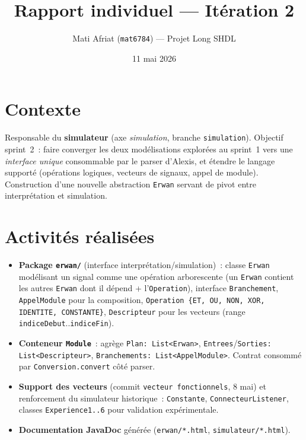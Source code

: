 \documentclass[11pt,a4paper]{article}
\title{\vspace{-1.5cm}Rapport individuel --- It\'eration 2}
\author{Mati Afriat (\texttt{mat6784}) --- Projet Long SHDL}
\date{11 mai 2026}
\begin{document}
\maketitle
\vspace{-2em}

\section*{Contexte}
Responsable du \textbf{simulateur} (axe \emph{simulation}, branche \texttt{simulation}). Objectif sprint~2~: faire converger les deux mod\'elisations explor\'ees au sprint~1 vers une \emph{interface unique} consommable par le parser d'Alexis, et \'etendre le langage support\'e (op\'erations logiques, vecteurs de signaux, appel de module). Construction d'une nouvelle abstraction \texttt{Erwan} servant de pivot entre interpr\'etation et simulation.

\section*{Activit\'es r\'ealis\'ees}
\begin{itemize}
  \item \textbf{Package \texttt{erwan/}} (interface interpr\'etation/simulation)~: classe \texttt{Erwan} mod\'elisant un signal comme une op\'eration arborescente (un \texttt{Erwan} contient les autres \texttt{Erwan} dont il d\'epend + l'\texttt{Operation}), interface \texttt{Branchement}, \texttt{AppelModule} pour la composition, \texttt{Operation \{ET, OU, NON, XOR, IDENTITE, CONSTANTE\}}, \texttt{Descripteur} pour les vecteurs (range \texttt{indiceDebut}..\texttt{indiceFin}).
  \item \textbf{Conteneur \texttt{Module}}~: agr\`ege \texttt{Plan: List<Erwan>}, \texttt{Entrees}/\texttt{Sorties: List<Descripteur>}, \texttt{Branchements: List<AppelModule>}. Contrat consomm\'e par \texttt{Conversion.convert} c\^ot\'e parser.
  \item \textbf{Support des vecteurs} (commit \texttt{vecteur fonctionnels}, 8 mai) et renforcement du simulateur historique~: \texttt{Constante}, \texttt{ConnecteurListener}, classes \texttt{Experience1..6} pour validation exp\'erimentale.
  \item \textbf{Documentation JavaDoc} g\'en\'er\'ee (\texttt{erwan/*.html}, \texttt{simulateur/*.html}).
\end{itemize}
\end{document}
